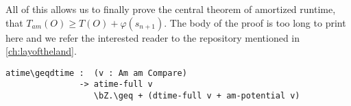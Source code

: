 All of this allows us to finally prove the central theorem of amortized runtime, that $T_{am}(O) \geq T(O) + \varphi(s_{n+1})$. The body of the proof is too long to print here and we refer the interested reader to the repository mentioned in \autoref{ch:layoftheland}.

\begin{lstlisting}[caption={Theorem: Amortized Time is an upper bound on Actual Time},emph={atime,dtime,pot,full,potential}]
atime\geqdtime :  (v : Am am Compare)
               -> atime-full v
                  \bZ.\geq + (dtime-full v + am-potential v)
\end{lstlisting}